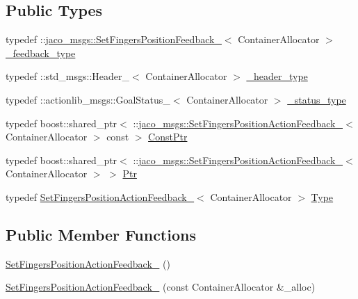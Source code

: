 \subsection*{Public Types}
\begin{DoxyCompactItemize}
\item 
typedef \+::\hyperlink{structjaco__msgs_1_1SetFingersPositionFeedback__}{jaco\+\_\+msgs\+::\+Set\+Fingers\+Position\+Feedback\+\_\+}$<$ Container\+Allocator $>$ \hyperlink{structjaco__msgs_1_1SetFingersPositionActionFeedback___aa7d354a74533751bde3ebc7132f09e71}{\+\_\+feedback\+\_\+type}
\item 
typedef \+::std\+\_\+msgs\+::\+Header\+\_\+$<$ Container\+Allocator $>$ \hyperlink{structjaco__msgs_1_1SetFingersPositionActionFeedback___afe617e8a3ac355e40e7b281da489d8a4}{\+\_\+header\+\_\+type}
\item 
typedef \+::actionlib\+\_\+msgs\+::\+Goal\+Status\+\_\+$<$ Container\+Allocator $>$ \hyperlink{structjaco__msgs_1_1SetFingersPositionActionFeedback___a7c18f9b312cacc62ecfd8aad585efacb}{\+\_\+status\+\_\+type}
\item 
typedef boost\+::shared\+\_\+ptr$<$ \+::\hyperlink{structjaco__msgs_1_1SetFingersPositionActionFeedback__}{jaco\+\_\+msgs\+::\+Set\+Fingers\+Position\+Action\+Feedback\+\_\+}$<$ Container\+Allocator $>$ const  $>$ \hyperlink{structjaco__msgs_1_1SetFingersPositionActionFeedback___a7836aaf964ebedaaa25add911ec288ff}{Const\+Ptr}
\item 
typedef boost\+::shared\+\_\+ptr$<$ \+::\hyperlink{structjaco__msgs_1_1SetFingersPositionActionFeedback__}{jaco\+\_\+msgs\+::\+Set\+Fingers\+Position\+Action\+Feedback\+\_\+}$<$ Container\+Allocator $>$ $>$ \hyperlink{structjaco__msgs_1_1SetFingersPositionActionFeedback___a635370310b4615d603f3cc6b7ec4e330}{Ptr}
\item 
typedef \hyperlink{structjaco__msgs_1_1SetFingersPositionActionFeedback__}{Set\+Fingers\+Position\+Action\+Feedback\+\_\+}$<$ Container\+Allocator $>$ \hyperlink{structjaco__msgs_1_1SetFingersPositionActionFeedback___ade3db42d18eb3c8f193bde2c56b43491}{Type}
\end{DoxyCompactItemize}
\subsection*{Public Member Functions}
\begin{DoxyCompactItemize}
\item 
\hyperlink{structjaco__msgs_1_1SetFingersPositionActionFeedback___aef4e41a5cf68250b2a21da99d027246d}{Set\+Fingers\+Position\+Action\+Feedback\+\_\+} ()
\item 
\hyperlink{structjaco__msgs_1_1SetFingersPositionActionFeedback___aa53db36116ed8d7b8b137e48ca9a50c9}{Set\+Fingers\+Position\+Action\+Feedback\+\_\+} (const Container\+Allocator \&\+\_\+alloc)
\end{DoxyCompactItemize}
